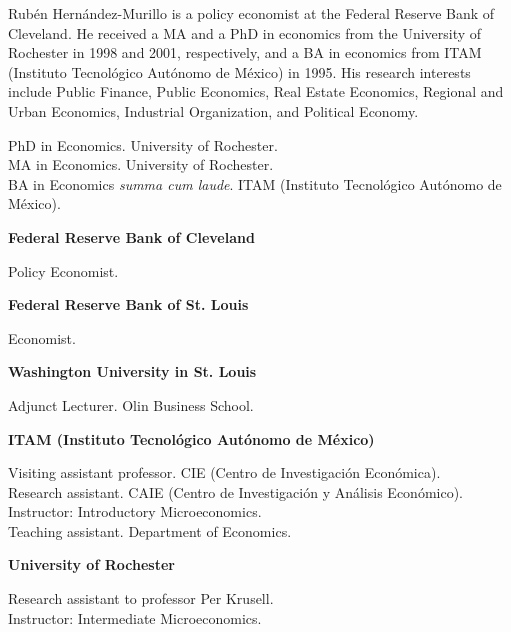 \documentclass{xetexCV}
\begin{document}
\makecvtitle


Rub\'{e}n Hern\'{a}ndez-Murillo is a  policy economist at the Federal Reserve Bank of Cleveland. He received a MA and a PhD in economics from the University of Rochester in 1998 and 2001, respectively, and a BA in economics from ITAM (Instituto Tecnol\'{o}gico Aut\'{o}nomo de M\'{e}xico) in 1995. His research interests include Public Finance, Public Economics, Real Estate Economics, Regional and Urban Economics, Industrial Organization,  and Political Economy.

PhD in Economics. University of Rochester.  \\
MA in Economics. University of Rochester.  \\
BA in Economics \emph{summa cum laude}. ITAM (Instituto Tecnol\'{o}gico Aut\'{o}nomo de M\'{e}xico).  \\


\begin{flushleft}
\textbf{Federal Reserve Bank of Cleveland}
\end{flushleft} 
Policy Economist.   \\
\begin{flushleft}
\textbf{Federal Reserve Bank of St. Louis}
\end{flushleft} 
Economist.   \\
\begin{flushleft}
\textbf{Washington University in St. Louis}
\end{flushleft} 
Adjunct Lecturer. Olin Business School.  \\
\begin{flushleft}
\textbf{ITAM (Instituto Tecnol\'{o}gico Aut\'{o}nomo de M\'{e}xico)} 
\end{flushleft} 
Visiting assistant professor. CIE (Centro de Investigaci\'{o}n Econ\'{o}mica).   \\
Research assistant. CAIE (Centro de Investigaci\'{o}n y An\'{a}lisis Econ\'{o}mico).   \\
Instructor: Introductory Microeconomics.  \\
Teaching assistant. Department of Economics.  
\begin{flushleft} 
\textbf{University of Rochester} 
\end{flushleft} 
Research assistant to professor Per Krusell.  \\
Instructor: Intermediate Microeconomics.  
\end{document}
